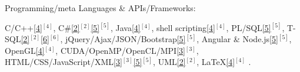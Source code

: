 \begin{cventries}

  \cventry
    {Programming/meta Languages \& APIs/Frameworks:} %
    {} %
    {} %
    {} %
    {     
      \begin{cvitems} %
        \item {
        C/C++\ref{4}{$^{[4]}$}, 
        C\#\ref{2}{$^{[2]}$}\ref{5}{$^{[5]}$}, 
        Java\ref{4}{$^{[4]}$}, 
        shell scripting\ref{4}{$^{[4]}$}, 
        PL/SQL\ref{5}{$^{[5]}$}, 
        T-SQL\ref{2}{$^{[2]}$}\ref{6}{$^{[6]}$},  
        jQuery/Ajax/JSON/Bootstrap\ref{5}{$^{[5]}$},  
        Angular %
        \& Node.js\ref{5}{$^{[5]}$},  
        OpenGL\ref{4}{$^{[4]}$},      
        CUDA/OpenMP/OpenCL/MPI\ref{3}{$^{[3]}$},
        HTML/CSS/JavaScript/XML\ref{3}{$^{[3]}$}\ref{5}{$^{[5]}$}, 
        UML\ref{2}{$^{[2]}$},
        LaTeX\ref{4}{$^{[4]}$}%
		.}
	  \end{cvitems}
    }  
  \vspace{-0.4cm}


\end{cventries}
